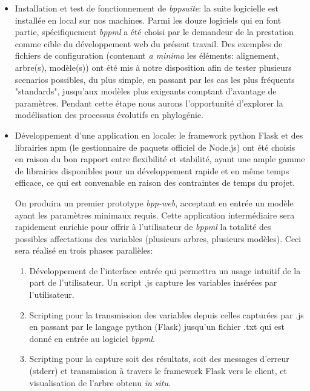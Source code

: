 \begin{itemize}
	\item Installation et test de fonctionnement de \textit{bppsuite}: la suite logicielle est installée en local sur nos machines. 
	Parmi les douze logiciels qui en font partie, spécifiquement   \textit{bppml} a été choisi par le demandeur de la prestation comme cible 
	du développement web du présent travail. Des exemples de fichiers de configuration (contenant \textit{a minima} les éléments: alignement, arbre(s), modèle(s)) 
	ont été mis à notre disposition  
	afin de tester plusieurs scenarios possibles, du plus simple, en passant par les cas les plus fréquents "standards", 
	jusqu'aux modèles plus exigeants comptant d'avantage de paramètres. Pendant cette étape nous aurons l'opportunité d'explorer
	 la modélisation des processus évolutifs en phylogénie.
	
	\item Développement d'une application en locale: le framework python Flask et des librairies npm
	(le gestionnaire de paquets officiel de Node.js) 
	ont été choisis en raison du bon rapport entre flexibilité et stabilité, 
	ayant une ample gamme de librairies disponibles pour un développement rapide et en même temps efficace, 
	ce qui est convenable en raison des contraintes de temps du projet.

	On produira un premier prototype  \textit{bpp-web}, acceptant en entrée un modèle ayant les paramètres minimaux requis. 
	Cette application intermédiaire sera rapidement enrichie pour offrir à l'utilisateur de \textit{bppml} la totalité des possibles affectations 
	des variables (plusieurs arbres, plusieurs modèles).
	Ceci sera réalisé en trois phases parallèles:
	\begin{enumerate}
		\item Développement de l'interface entrée qui permettra un usage intuitif de la part de l'utilisateur. 
		Un script .js capture les variables insérées par l'utilisateur. 
		\item Scripting pour la transmission des variables depuis celles capturées par .js en passant par le langage 
		python (Flask) jusqu'un fichier .txt qui est donné en entrée au logiciel \textit{bppml}.
		\item Scripting pour la capture soit des résultats, soit des messages d'erreur (stderr) et transmission à travers 
		le framework Flask vers le client, et visualisation de l'arbre obtenu \textit{in situ}. 
	\end{enumerate}
	

\end{itemize}
